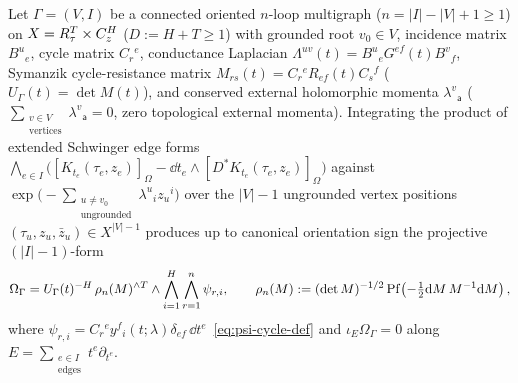\begin{theorem}
\label{thm:heat-kernel-omega-gamma}
Let $\Gamma = (V,I)$ be a connected oriented $n$-loop multigraph ($n = |I|-|V|+1 \ge 1$) on $X = R^T_\tau\times C^H_z$ ($D := H+T \ge 1$) with grounded root $v_0 \in V$, incidence matrix $B^u{}_e$, cycle matrix $C_r{}^e$, conductance Laplacian $\Lambda^{uv}(t) = B^u{}_e G^{ef}(t)B^v{}_f$, Symanzik cycle-resistance matrix $M_{rs}(t) = C_r{}^e R_{ef}(t)C_s{}^f$ ($U_\Gamma(t) = \det M(t)$), and conserved external holomorphic momenta $\lambda^v{}_{\mathsf{a}}$ ($\sum_{\substack{v\in V\\\mathrm{vertices}}}\lambda^v{}_{\mathsf{a}} = 0$, zero topological external momenta). Integrating the product of extended Schwinger edge forms $\bigwedge_{e\in I}\bigl([K_{t_e}(\tau_e,z_e)]_\Omega - \dd t_e\wedge[D^* K_{t_e}(\tau_e,z_e)]_\Omega\bigr)$ against $\exp\bigl(-\sum_{\substack{u\neq v_0\\\mathrm{ungrounded}}}\lambda^u{}_i z_u{}^i\bigr)$ over the $|V|-1$ ungrounded vertex positions $(\tau_u, z_u, \bar{z}_u) \in X^{|V|-1}$ produces up to canonical orientation sign the projective $(|I|-1)$-form
\begin{equation}
\label{eq:sec3-omega-gamma-derived}
\Omega_\Gamma = U_\Gamma(t)^{-H}\,\rho_n(M)^{\wedge T}\wedge\bigwedge_{i=1}^H\bigwedge_{r=1}^n\psi_{r,i},\qquad
\rho_n(M) := (\det M)^{-1/2}\operatorname{Pf}\!\left(-\tfrac{1}{2}\mathrm{d} M\,M^{-1}\mathrm{d} M\right),
\end{equation}
where $\psi_{r,i} = C_r{}^e y^f{}_i(t;\lambda)\delta_{ef}\,\dd t^e$~\eqref{eq:psi-cycle-def} and $\iota_E\Omega_\Gamma = 0$ along $E = \sum_{\substack{e\in I\\\mathrm{edges}}}t^e\partial_{t^e}$.
\end{theorem}

